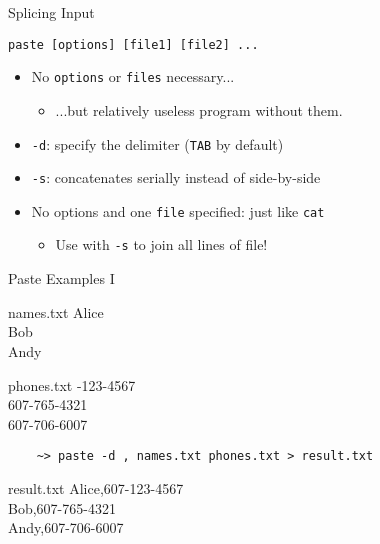 \begin{frame}[fragile]{Splicing Input}
  \begin{block}{}
    \texttt{paste [options] [file1] [file2] ...}
    \begin{itemize}
      \item No \texttt{options} or \texttt{files} necessary...
      \begin{itemize}
        \item[] ...but relatively useless program without them.
      \end{itemize}
      \item \texttt{-d}: specify the delimiter (\texttt{TAB} by default)
      \item \texttt{-s}: concatenates serially instead of side-by-side
      \item No options and one \texttt{file} specified: just like \texttt{cat}
      \begin{itemize}
        \item Use with \texttt{-s} to join all lines of file!
      \end{itemize}
    \end{itemize}
  \end{block}
\end{frame}

\begin{frame}[fragile]{Paste Examples I}
  \begin{block}{names.txt}
    {\footnotesize\ttfamily
      Alice\\
      Bob\\
      Andy\\
    }
  \end{block}
  \begin{block}{phones.txt}
    {\footnotesize{}-123-4567\\
      607-765-4321\\
      607-706-6007\\
    }
  \end{block}
  \begin{verbatim}
    ~> paste -d , names.txt phones.txt > result.txt
  \end{verbatim}
  \begin{block}{result.txt}
    {\footnotesize\ttfamily
      Alice,607-123-4567\\
      Bob,607-765-4321\\
      Andy,607-706-6007\\
    }
  \end{block}
\end{frame}

